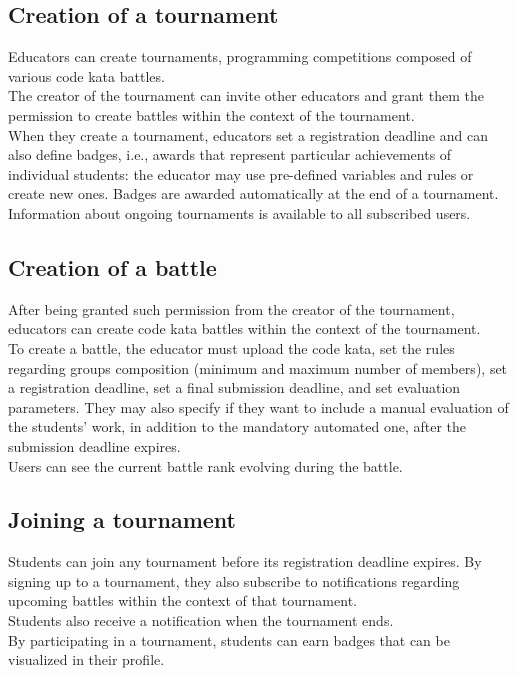 \subsection{Creation of a tournament}
Educators can create tournaments, programming competitions composed of various code kata battles.\\
The creator of the tournament can invite other educators and grant them the permission to create battles within the 
context of the tournament.\\
When they create a tournament, educators set a registration deadline and can also define badges, i.e., awards that 
represent particular achievements of individual students: the educator may use pre-defined variables and rules or create 
new ones. Badges are awarded automatically at the end of a tournament.\\
Information about ongoing tournaments is available to all subscribed users.\\

\subsection{Creation of a battle}
After being granted such permission from the creator of the tournament, educators can create code kata battles within the
context of the tournament.\\
To create a battle, the educator must upload the code kata, set the rules regarding groups composition (minimum and maximum 
number of members), set a registration deadline, set a final submission deadline, and set evaluation parameters. They may also 
specify if they want to include a manual evaluation of the students' work, in addition to the mandatory automated one, after the 
submission deadline expires.\\
Users can see the current battle rank evolving during the battle.\\

\subsection{Joining a tournament}
Students can join any tournament before its registration deadline expires. By signing up to a tournament, they also 
subscribe to notifications regarding upcoming battles within the context of that tournament.\\
Students also receive a notification when the tournament ends.\\
By participating in a tournament, students can earn badges that can be visualized in their profile.\\

